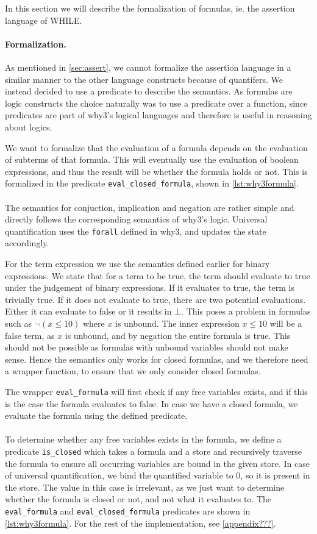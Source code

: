 In this section we will describe the formalization of formulas, ie. the assertion language of WHILE.

\paragraph{Formalization.}
As mentioned in \ref{sec:assert}, we cannot formalize the assertion language in a similar manner to
the other language constructs because of quantifers.
We instead decided to use a predicate to describe the semantics.
As formulas are logic constructs the choice naturally was to use a predicate over a function,
since predicates are part of why3's logical languages and therefore is useful in reasoning about logics.

We want to formalize that the evaluation of a formula depends on the evaluation of subterms
of that formula. This will eventually use the evaluation of boolean expressions, and thus
the result will be whether the formula holds or not.
This is formalized in the predicate \texttt{eval\_closed\_formula}, shown in \autoref{lst:why3formula}.
\\~\\
The semantics for conjuction, implication and negation are rather simple and directly follows the corresponding
semantics of why3's logic.
Universal quantification uses the \texttt{forall} defined in why3, and updates the state accordingly.

For the term expression we use the semantics defined earlier for binary expressions.
We state that for a term to be true, the term should evaluate to true under the judgement of binary expressions.
If it evaluates to true, the term is trivially true.
If it does not evaluate to true, there are two potential evaluations.
Either it can evaluate to false or it results in $\bot$.
This poses a problem in formulas such as $\neg (x \leq 10)$ where $x$ is unbound.
The inner expression $x \leq 10$ will be a false term, as $x$ is unbound, and by negation the entire formula is true.
This should not be possible as formulas with unbound variables should not make sense.
Hence the semantics only works for closed formulas, and we therefore need a wrapper function, to ensure that we only consider closed formulas.

The wrapper \texttt{eval\_formula} will first check if any free variables exists, and
if this is the case the formula evaluates to false.
In case we have a closed formula, we evaluate the formula using the defined predicate.
\\~\\
To determine whether any free variables exists in the formula, we define a predicate
\texttt{is\_closed} which takes a formula and a store and recursively traverse the formula to ensure all occurring variables are bound in the given store.
In case of universal quantification, we bind the quantified variable to 0,
so it is present in the store. The value in this case is irrelevant, as we just want to determine whether the formula is closed or not, and not what it evaluates to.
The \texttt{eval\_formula} and \texttt{eval\_closed\_formula} predicates are shown in
\autoref{lst:why3formula}. For the rest of the implementation, see \autoref{appendix???}.

